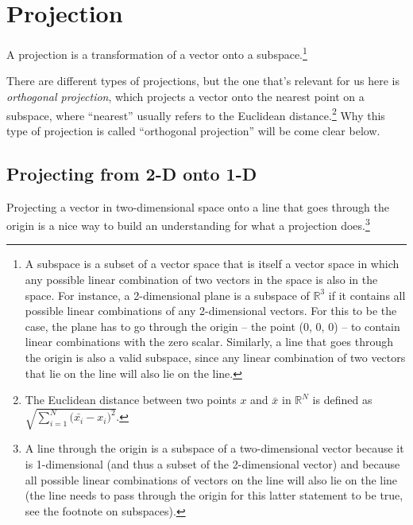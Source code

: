 \documentclass[
  letterpaper,
  DIV=11,
  numbers=noendperiod]{scrartcl}
\author{}
\date{}
\begin{document}
\ifdefined\Shaded\renewenvironment{Shaded}{\begin{tcolorbox}[interior hidden, boxrule=0pt, borderline west={3pt}{0pt}{shadecolor}, frame hidden, breakable, sharp corners, enhanced]}{\end{tcolorbox}}\fi

\hypertarget{sec-projection}{%
\section{Projection}\label{sec-projection}}

A projection is a transformation of a vector onto a subspace.\footnote{A
  subspace is a subset of a vector space that is itself a vector space
  in which any possible linear combination of two vectors in the space
  is also in the space. For instance, a 2-dimensional plane is a
  subspace of \(\mathbb{R}^3\) if it contains all possible linear
  combinations of any 2-dimensional vectors. For this to be the case,
  the plane has to go through the origin -- the point (0, 0, 0) -- to
  contain linear combinations with the zero scalar. Similarly, a line
  that goes through the origin is also a valid subspace, since any
  linear combination of two vectors that lie on the line will also lie
  on the line.}

There are different types of projections, but the one that's relevant
for us here is \emph{orthogonal projection}, which projects a vector
onto the nearest point on a subspace, where ``nearest'' usually refers
to the Euclidean distance.\footnote{The Euclidean distance between two
  points \(x\) and \(\bar{x}\) in \(\mathbb{R}^N\) is defined as
  \(\sqrt{\sum_{i=1}^N{(\bar{x_i} - x_i})^2}\).} Why this type of
projection is called ``orthogonal projection'' will be come clear below.

\hypertarget{projecting-from-2-d-onto-1-d}{%
\subsection{Projecting from 2-D onto
1-D}\label{projecting-from-2-d-onto-1-d}}

Projecting a vector in two-dimensional space onto a line that goes
through the origin is a nice way to build an understanding for what a
projection does.\footnote{A line through the origin is a subspace of a
  two-dimensional vector because it is 1-dimensional (and thus a subset
  of the 2-dimensional vector) and because all possible linear
  combinations of vectors on the line will also lie on the line (the
  line needs to pass through the origin for this latter statement to be
  true, see the footnote on subspaces).}
\end{document}

